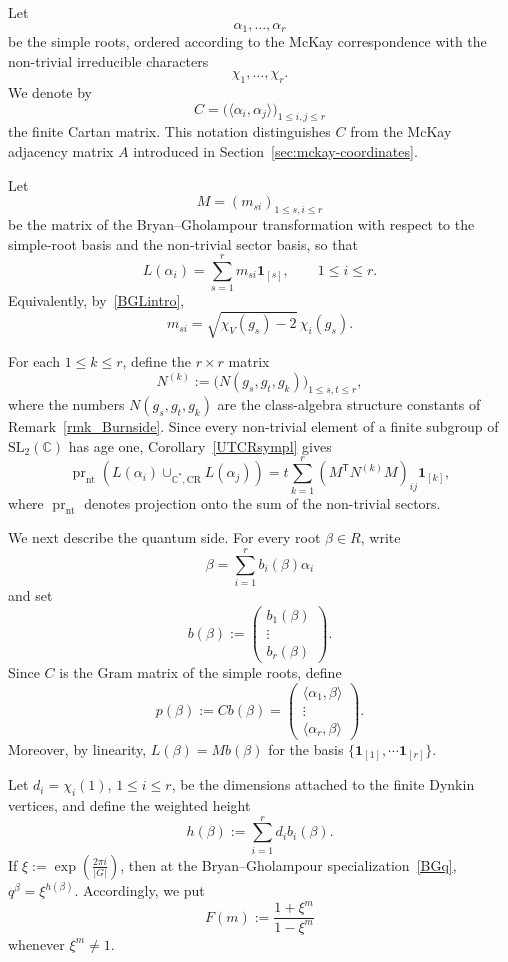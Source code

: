 \documentclass[a4paper,reqno]{amsart}
\theoremstyle{plain} %
\theoremstyle{definition} %
\theoremstyle{remark} %
\newcommand{\1}{\mathds{1}}   %
\begin{document}
Let
\[
\alpha_1,\ldots,\alpha_r
\]
be the simple roots, ordered according to the McKay correspondence with
the non-trivial irreducible characters
\[
\chi_1,\ldots,\chi_r.
\]
We denote by
\[
C=\bigl(\langle\alpha_i,\alpha_j\rangle\bigr)_{1\le i,j\le r}
\]
the finite Cartan matrix.  This notation distinguishes \(C\) from the
McKay adjacency matrix \(A\) introduced in Section~\ref{sec:mckay-coordinates}.

Let
\[
M=(m_{si})_{1\le s,i\le r}
\]
be the matrix of the Bryan--Gholampour transformation with respect to
the simple-root basis and the non-trivial sector basis, so that
\[
L(\alpha_i)
=
\sum_{s=1}^r m_{si}\mathbf 1_{[s]},
\qquad
1\le i\le r.
\]
Equivalently, by~\eqref{BGLintro},
\[
m_{si}
=
\sqrt{\chi_V(g_s)-2}\,\chi_i(g_s).
\]

For each \(1\le k\le r\), define the \(r\times r\) matrix
\[
N^{(k)}
:=
\bigl(N(g_s,g_t,g_k)\bigr)_{1\le s,t\le r},
\]
where the numbers \(N(g_s,g_t,g_k)\) are the class-algebra structure
constants of Remark~\ref{rmk_Burnside}.  Since every non-trivial element of a finite
subgroup of \(\mathrm{SL}_2(\mathbb C)\) has age one, Corollary~\ref{UTCRsympl}
gives
\[
\operatorname{pr}_{\mathrm{nt}}
\left(
L(\alpha_i)
\cup_{\mathbb C^*,\mathrm{CR}}
L(\alpha_j)
\right)
=
t\sum_{k=1}^r
\left(M^{\mathsf T}N^{(k)}M\right)_{ij}
\mathbf 1_{[k]},
\]
where \(\operatorname{pr}_{\mathrm{nt}}\) denotes projection onto the
sum of the non-trivial sectors.

We next describe the quantum side.  For every root
\(\beta\in R\), write
\[
\beta
=
\sum_{i=1}^r b_i(\beta)\alpha_i
\]
and set
\[
b(\beta)
:=
\begin{pmatrix}
b_1(\beta)\\
\vdots\\
b_r(\beta)
\end{pmatrix}.
\]
Since \(C\) is the Gram matrix of the simple roots, define
\[
p(\beta)
:=
Cb(\beta)
=
\begin{pmatrix}
\langle\alpha_1,\beta\rangle\\
\vdots\\
\langle\alpha_r,\beta\rangle
\end{pmatrix}.
\]
Moreover, by linearity, $L(\beta)=Mb(\beta)$ for the basis $\{\mathbf 1_{[1]}, \cdots \mathbf 1_{[r]}\}$.

Let $d_i=\chi_i(1)$, $1\le i\le r$, 
be the dimensions attached to the finite Dynkin vertices, and define
the weighted height
\[
h(\beta)
:=
\sum_{i=1}^r d_i b_i(\beta).
\] 
If $\xi:=\exp\left(\frac{2\pi i}{|G|}\right)$, then at the Bryan--Gholampour specialization~\eqref{BGq},
$q^\beta=\xi^{h(\beta)}$. 
Accordingly, we put
\[
F(m)
:=
\frac{1+\xi^m}{1-\xi^m}
\]
whenever \(\xi^m\ne1\).  
\end{document}
